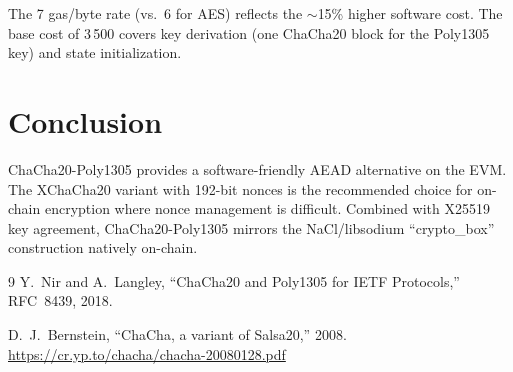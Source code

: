\documentclass[11pt,a4paper]{article}
\begin{document}
The 7 gas/byte rate (vs.~6 for AES) reflects the $\sim$15\% higher software cost.
The base cost of 3\,500 covers key derivation (one ChaCha20 block for the Poly1305
key) and state initialization.

\section{Conclusion}

ChaCha20-Poly1305 provides a software-friendly AEAD alternative on the EVM. The
XChaCha20 variant with 192-bit nonces is the recommended choice for on-chain
encryption where nonce management is difficult. Combined with X25519 key
agreement, ChaCha20-Poly1305 mirrors the NaCl/libsodium ``crypto\_box''
construction natively on-chain.

\begin{thebibliography}{9}
  Y.~Nir and A.~Langley, ``ChaCha20 and Poly1305 for IETF Protocols,''
  RFC~8439, 2018.

  D.~J.~Bernstein, ``ChaCha, a variant of Salsa20,'' 2008.
  \url{https://cr.yp.to/chacha/chacha-20080128.pdf}
\end{thebibliography}
\end{document}
